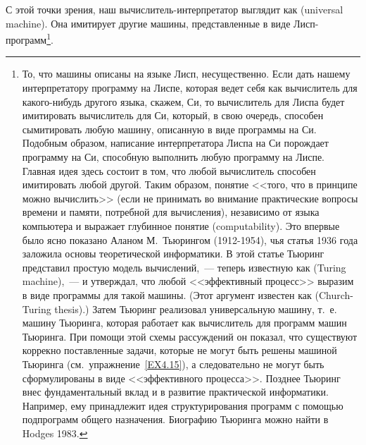 С этой точки зрения, наш вычислитель-интерпретатор выглядит
как 
 (universal machine).
Она имитирует другие машины, представленные в виде
Лисп-программ\footnote{То, что машины описаны на языке Лисп,
несущественно. Если дать нашему интерпретатору программу на Лиспе,
которая ведет себя как вычислитель для какого-нибудь другого языка,
скажем, Си, то вычислитель для Лиспа будет имитировать вычислитель для Си,
который, в свою очередь, способен сымитировать любую машину, описанную
в виде программы на Си.  Подобным образом, написание интерпретатора
Лиспа на Си порождает программу на Си, способную выполнить любую
программу на Лиспе.  Главная идея здесь состоит в том, что любой
вычислитель способен имитировать любой другой.  Таким образом,
понятие <<того, что в принципе можно вычислить>> (если не принимать во
внимание практические вопросы времени и памяти, потребной для
вычисления), независимо от языка компьютера и выражает глубинное
понятие  
 (computability).  Это впервые
было ясно показано Аланом М.~Тьюрингом (1912-1954),
чья статья 1936
года заложила основы теоретической 
информатики. В этой статье Тьюринг
представил простую модель вычислений,~--- теперь известную как 
 (Turing machine),~--- и 
утверждал, 
что любой <<эффективный процесс>> выразим в виде программы для такой
машины. (Этот аргумент известен как 
 (Church-Turing thesis).)
Затем Тьюринг реализовал универсальную машину, т.~е. машину Тьюринга,
которая работает как вычислитель для программ машин Тьюринга.  При
помощи этой схемы рассуждений он показал, что существуют коррекно
поставленные задачи, которые не могут быть решены машиной Тьюринга
(см.~упражнение~\ref{EX4.15}), а следовательно не могут
быть сформулированы в виде <<эффективного процесса>>.  Позднее Тьюринг
внес фундаментальный вклад и в развитие практической информатики.
Например, ему принадлежит идея 
структурирования программ с помощью 
подпрограмм общего назначения.  Биографию Тьюринга можно найти в 
Hodges 1983.}.

